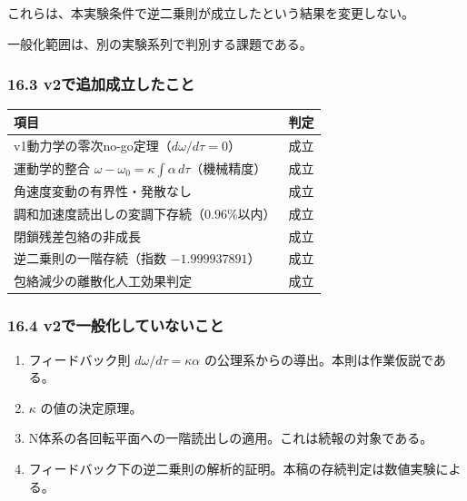 \documentclass[
  a4paper,
]{ltjsarticle}
\newcounter{none} %
\providecommand{\tightlist}{%
  \setlength{\itemsep}{0pt}\setlength{\parskip}{0pt}}
\begin{document}
これらは、本実験条件で逆二乗則が成立したという結果を変更しない。

一般化範囲は、別の実験系列で判別する課題である。

\subsubsection{16.3
v2で追加成立したこと}\label{v2ux3067ux8ffdux52a0ux6210ux7acbux3057ux305fux3053ux3068}

{\def\LTcaptype{none} %
\begin{longtable}[]{@{}
  >{\raggedright\arraybackslash}p{}
  >{\raggedright\arraybackslash}p{}@{}}
\toprule\noalign{}
\begin{minipage}[b]{\linewidth}\raggedright
項目
\end{minipage} & \begin{minipage}[b]{\linewidth}\raggedright
判定
\end{minipage} \\
\midrule\noalign{}
\endhead
\bottomrule\noalign{}
\endlastfoot
v1動力学の零次no-go定理（\(d\omega/d\tau=0\)） & 成立 \\
運動学的整合 \(\omega-\omega_0=\kappa\int\alpha\,d\tau\)（機械精度） &
成立 \\
角速度変動の有界性・発散なし & 成立 \\
調和加速度読出しの変調下存続（\(0.96\%\)以内） & 成立 \\
閉鎖残差包絡の非成長 & 成立 \\
逆二乗則の一階存続（指数 \(-1.999937891\)） & 成立 \\
包絡減少の離散化人工効果判定 & 成立 \\
\end{longtable}
}

\subsubsection{16.4
v2で一般化していないこと}\label{v2ux3067ux4e00ux822cux5316ux3057ux3066ux3044ux306aux3044ux3053ux3068}

\begin{enumerate}
\def\labelenumi{\arabic{enumi}.}
\tightlist
\item
  フィードバック則 \(d\omega/d\tau=\kappa\alpha\)
  の公理系からの導出。本則は作業仮説である。
\item
  \(\kappa\) の値の決定原理。
\item
  N体系の各回転平面への一階読出しの適用。これは続報の対象である。
\item
  フィードバック下の逆二乗則の解析的証明。本稿の存続判定は数値実験による。
\end{enumerate}
\end{document}
